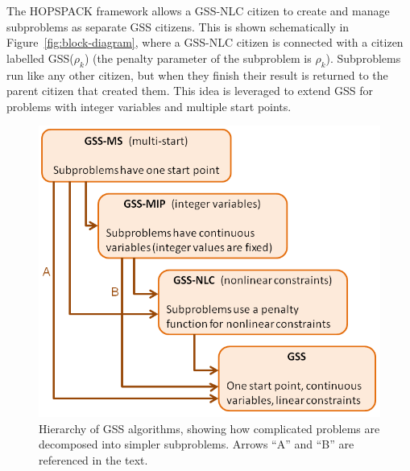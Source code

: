 The HOPSPACK framework allows a GSS-NLC citizen to create and manage subproblems
as separate GSS citizens.  This is shown schematically in
Figure~\ref{fig:block-diagram}, where a GSS-NLC citizen is connected with
a citizen labelled GSS($\rho_k$) (the penalty parameter of the subproblem
is $\rho_k$).  Subproblems run like any other citizen, but when they finish
their result is returned to the parent citizen that created them.
This idea is leveraged to extend GSS for problems with integer variables
and multiple start points.


\begin{figure}[!ht]
  \begin{center}
    \includegraphics[width=5.0in]{GssHierarchyDiagram.png}
    \vspace{-5mm}
  \caption{Hierarchy of GSS algorithms,
           showing how complicated problems are decomposed into
           simpler subproblems.
           Arrows ``A'' and ``B'' are referenced in the text.
          }
  \label{fig:gss-hier}
  \end{center}
\end{figure}

